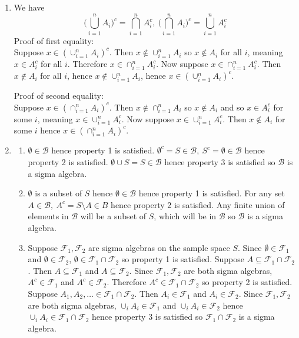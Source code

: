 \documentclass{article}
\begin{document}
\begin{enumerate}
    \item We have \[
    \Big( \bigcup_{i = 1}^{n} A_i \Big)^{c} = \bigcap_{i = 1}^{n} A_{i}^{c}, \
    \Big( \bigcap_{i = 1}^{n} A_i \Big)^{c} = \bigcup_{i = 1}^{n} A_{i}^{c}
    \]
    Proof of first equality: \\
    Suppose $x \in (\cup_{i = 1}^{n} A_i)^c$. Then $x \notin \cup_{i = 1}^{n} A_i$ so
    $x \notin A_i$ for all $i$, meaning $x \in A_{i}^{c}$ for all $i$. Therefore
    $x \in \cap_{i = 1}^{n} A_{i}^{c}$.
    Now suppose $x \in \cap_{i = 1}^{n} A_{i}^{c}$.
    Then $x \notin A_i$ for all $i$, hence $x \notin \cup_{i = 1}^{n} A_{i}$, hence
    $x \in (\cup_{i = 1}^{n} A_i)^c$.

    Proof of second equality: \\
    Suppose $x \in (\cap_{i = 1}^{n} A_i)^{c}$. Then $x \notin \cap_{i = 1}^{n} A_i$ so
    $x \notin A_i$ and so $x \in A_{i}^{c}$ for some $i$, meaning
    $x \in \cup_{i = 1}^{n} A_i^c$.
    Now suppose $x \in \cup_{i = 1}^{n} A_i^c$. Then $x \notin A_i$ for some $i$ hence
    $x \in (\cap_{i = 1}^{n} A_i)^{c}$.

    \item \begin{enumerate}
        \item $\emptyset \in \mathcal{B}$ hence property 1 is satisfied.
        $\emptyset^{c} = S \in \mathcal{B}, \ S^{c} = \emptyset \in \mathcal{B}$ hence
        property 2 is satisfied. $\emptyset \cup S = S \in \mathcal{B}$ hence property
        3 is satisfied so $\mathcal{B}$ is a sigma algebra.

        \item $\emptyset$ is a subset of $S$ hence $\emptyset \in \mathcal{B}$ hence property
        1 is satisfied. For any set $A \in \mathcal{B}, \ A^{c} = S \setminus A \in B$ hence
        property 2 is satisfied. Any finite union of elements in $\mathcal{B}$ will be a
        subset of $S$, which will be in $\mathcal{B}$ so $\mathcal{B}$ is a sigma algebra.

        \item Suppose $\mathcal{F}_1, \mathcal{F}_2$ are sigma algebras on the sample space
        $S$. Since $\emptyset \in \mathcal{F}_1$ and $\emptyset \in \mathcal{F}_2$,
        $\emptyset \in \mathcal{F}_1 \cap \mathcal{F}_2$ so property 1 is satisfied.
        Suppose $A \subseteq \mathcal{F}_1 \cap \mathcal{F}_2$. Then $A \subseteq \mathcal{F}_1$
        and $A \subseteq \mathcal{F}_2$. Since $\mathcal{F}_1, \mathcal{F}_2$ are both sigma
        algebras, $A^{c} \in \mathcal{F}_1$ and $A^{c} \in \mathcal{F}_2$. Therefore
        $A^{c} \in \mathcal{F}_1 \cap \mathcal{F}_2$ so property 2 is satisfied.
        Suppose $A_1, A_2, \dots \in \mathcal{F}_1 \cap \mathcal{F}_2$. Then
        $A_i \in \mathcal{F}_1$ and $A_i \in \mathcal{F}_2$. Since $\mathcal{F}_1,
        \mathcal{F}_2$ are both sigma algebras, $\cup_{i} A_i \in \mathcal{F}_1$ and
        $\cup_{i} A_i \in \mathcal{F}_2$ hence $\cup_{i} A_i \in \mathcal{F}_1
        \cap \mathcal{F}_2$ hence property 3 is satisfied so $\mathcal{F}_1 \cap \mathcal{F}_2$
        is a sigma algebra.
    \end{enumerate}


\end{enumerate}
\end{document}
